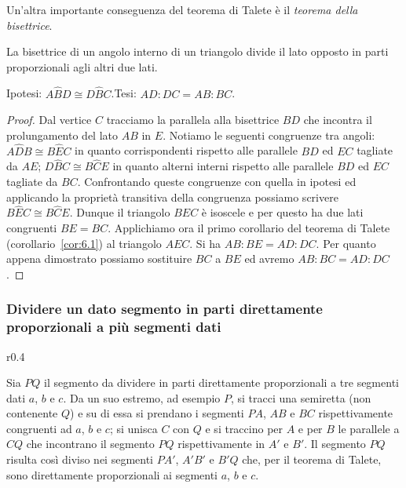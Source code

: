 Un'altra importante conseguenza del teorema di Talete è il 
\emph{teorema della bisettrice}.
\begin{teorema}
La bisettrice di un angolo interno di un triangolo divide il lato 
opposto in parti proporzionali agli altri due lati.
\end{teorema}

\noindent\begin{minipage}{0.65\textwidth}\parindent15pt
\noindent Ipotesi: \(A\widehat{B}D\cong D\widehat{B}C\).\tab\tab Tesi: 
\(AD : DC = AB : BC\).

\begin{proof}
Dal vertice \(C\) tracciamo la parallela alla bisettrice \(BD\) che 
incontra il prolungamento del lato \(AB\) in \(E\). Notiamo le seguenti 
congruenze tra angoli: \(A\widehat{D}B\cong B\widehat{E}C\) in quanto 
corrispondenti rispetto alle parallele \(BD\) ed \(EC\) tagliate da \(AE\); 
\(D\widehat{B}C\cong B\widehat{C}E\) in quanto alterni interni rispetto 
alle parallele \(BD\) ed \(EC\) tagliate da \(BC\).
Confrontando queste congruenze con quella in ipotesi ed applicando la 
proprietà transitiva della congruenza possiamo scrivere 
\(B\widehat{E}C\cong B\widehat{C}E\). Dunque il triangolo \(BEC\) è 
isoscele e per questo ha due lati congruenti \(BE = BC\).
Applichiamo ora il primo corollario del teorema di Talete 
(corollario~\ref{cor:6.1}) al triangolo \(AEC\). Si ha \(AB : BE = AD : 
DC\). 
Per quanto appena dimostrato possiamo sostituire \(BC\) a \(BE\) ed 
avremo \(AB : BC = AD : DC\).
\end{proof}
\end{minipage}\hfil
\begin{minipage}{0.35\textwidth}
	\centering
\end{minipage}\vspace{5pt}

\subsubsection{Dividere un dato segmento in parti direttamente 
proporzionali a più segmenti dati}
\nopagebreak
\begin{wrapfigure}{r}{0.4\textwidth}
	\centering
\end{wrapfigure}
Sia \(PQ\) il segmento da dividere in parti direttamente proporzionali 
a tre segmenti dati \(a\), \(b\) e \(c\).
Da un suo estremo, ad esempio \(P\), si tracci una semiretta (non 
contenente \(Q\)) e su di essa si prendano i segmenti \(PA\), \(AB\) e \(BC\) 
rispettivamente congruenti ad \(a\), \(b\) e \(c\); si unisca \(C\) con \(Q\) e 
si traccino per \(A\) e per \(B\) le parallele a \(CQ\) che incontrano il 
segmento \(PQ\) rispettivamente in \(A'\) e \(B'\). Il segmento \(PQ\) 
risulta così diviso nei segmenti \(PA'\), \(A'B'\) e \(B'Q\) che, per il 
teorema di Talete, sono direttamente proporzionali ai segmenti \(a\), 
\(b\) e \(c\).

